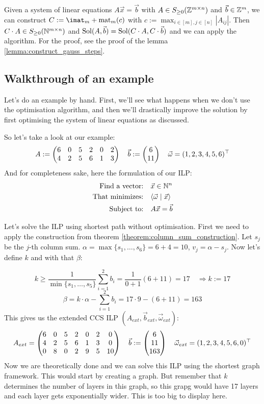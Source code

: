 Given a system of linear equations $A\vec x = \vec b$ with $A \in S_{\geq 0}(\mathbb{Z}^{m \times n})$ and $\vec b \in \mathbb{Z}^{m}$, we can construct $C := \imat_m + \opmat_m(c)$ with $c := \max_{i\in[m], j\in[n]} |A_{ij}|$. Then $C \cdot A \in S_{\geq 0}(\mathbb{N}^{m \times n})$ and $\operatorname{Sol}(A, \vec b) = \operatorname{Sol}(C\cdot A, C\cdot \vec b)$ and we can apply the algorithm. For the proof, see the proof of the lemma \ref{lemma:construct_gauss_steps}.
   
\subsection{Walkthrough of an example}
Let's do an example by hand. First, we'll see what happens when we don't use the optimisation algorithm, and then we'll drastically improve the solution by first optimising the system of linear equations as discussed.

So let's take a look at our example:
$$A:= \left(\begin{matrix}6&0&5&2&0&2\\4&2&5&6&1&3\end{matrix}\right)\quad\vec b:= \left(\begin{matrix}6\\11\end{matrix}\right) \quad \vec\omega = (1, 2, 3, 4, 5, 6)^\top$$
And for completeness sake, here the formulation of our ILP:
\begin{align*}
    \text{Find a vector:} & \quad \vec x \in \mathbb{N}^n \\
    \text{That minimizes:} & \quad \langle \vec \omega \mid \vec x \rangle\\
    \text{Subject to:} & \quad A\vec x = \vec b \\
\end{align*}

Let's solve the ILP using shortest path without optimisation. First we need to apply the construction from theorem \ref{theorem:column_sum_construction}. Let $s_j$ be the $j$-th column sum. $\alpha = \max\{s_1, \dots, s_6\} = 6+4=10$, $v_j = \alpha - s_j$. Now let's define $k$ and with that $\beta$:

$$k \geq \frac{1}{\min\{s_1, \dots, s_5\}} \sum_{i=1}^{2}b_i = \frac{1}{0+1}(6+11) = 17 \quad \Rightarrow k := 17$$ 
$$\beta = k\cdot\alpha - \sum_{i=1}^{2}b_i = 17\cdot9-(6+11) = 163$$
This gives us the extended CCS ILP $(A_{ext}, \vec b_{ext}, \vec\omega_{ext})$:
$$A_{ext} = \left(\begin{matrix}6&0&5&2&0&2&0\\4&2&5&6&1&3&0\\0&8&0&2&9&5&10\end{matrix}\right)\quad\vec b:= \left(\begin{matrix}6\\11\\163\end{matrix}\right)\quad \vec\omega_{ext} = (1, 2, 3, 4, 5, 6, 0)^\top$$
Now we are theoretically done and we can solve this ILP using the shortest graph framework. This would start by creating a graph. But remember that $k$ determines the number of layers in this graph, so this grapg would have 17 layers and each layer gets exponentially wider. This is too big to display here.

